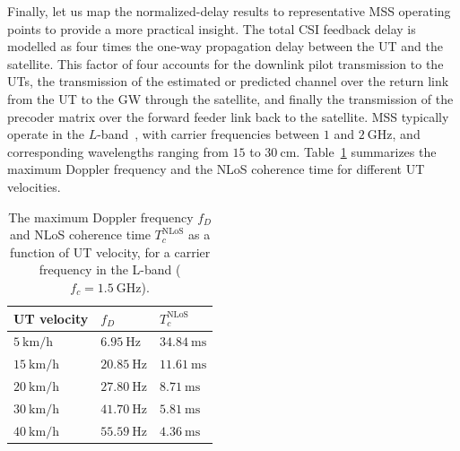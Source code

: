 Finally, let us map the normalized-delay results to representative \ac{MSS} operating points to provide a more practical insight.
The total \ac{CSI} feedback delay is modelled as four times the one-way propagation delay between the \ac{UT} and the satellite. This factor of four accounts for the downlink pilot transmission to the \acp{UT}, the transmission of the estimated or predicted channel over the return link from the \ac{UT} to the \ac{GW} through the satellite, and finally the transmission of the precoder matrix over the forward feeder link back to the satellite.
\ac{MSS} typically operate in the $L$-band~\cite{1_signal_processing_for_satellites}, with carrier frequencies between $1$ and $2~\mathrm{GHz}$, and corresponding wavelengths ranging from $15$ to $30~\mathrm{cm}$.
Table~\ref{tab:coherence_times} summarizes the maximum Doppler frequency and the \ac{NLoS} coherence time for different \ac{UT} velocities.
\begin{table}[!htb]
    \centering
    \renewcommand{\arraystretch}{1.25}
    \setlength{\tabcolsep}{10pt}

    \begin{tabular}{>{\centering\arraybackslash}m{3.2cm}|>{\centering\arraybackslash}m{2.8cm}>{\centering\arraybackslash}m{2.8cm}}
        \hline
        \textbf{UT velocity} & $f_D$ & $T_c^{\mathrm{NLoS}}$ \\
        \hline
        $5~\mathrm{km/h}$  & $6.95~\mathrm{Hz}$  & $34.84~\mathrm{ms}$ \\
        $15~\mathrm{km/h}$ & $20.85~\mathrm{Hz}$ & $11.61~\mathrm{ms}$ \\
        $20~\mathrm{km/h}$ & $27.80~\mathrm{Hz}$ & $8.71~\mathrm{ms}$  \\
        $30~\mathrm{km/h}$ & $41.70~\mathrm{Hz}$ & $5.81~\mathrm{ms}$  \\
        $40~\mathrm{km/h}$ & $55.59~\mathrm{Hz}$ & $4.36~\mathrm{ms}$  \\
        \hline
    \end{tabular}

    \caption[\acs{NLoS} coherence time at $f_c = 1.5~\mathrm{GHz}$ (L-band) for various \ac{UT} velocities]{
        The maximum Doppler frequency $f_D$ and \ac{NLoS} coherence time $T_c^{\mathrm{NLoS}}$ as a function of \ac{UT} velocity, for a carrier frequency in the L-band ($f_c = 1.5~\mathrm{GHz}$).
    }
    \label{tab:coherence_times}
\end{table}

